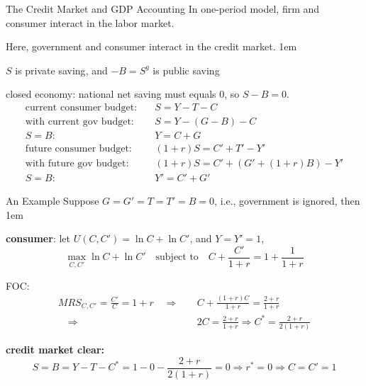 \documentclass[11pt,aspectratio=43,usenames,dvipsnames]{beamer}
\newcommand{\orange}[1]{\textcolor{BurntOrange}{#1}}
\let\olditemize=\itemize
\let\endolditemize=\enditemize
\renewenvironment{itemize}{\olditemize \itemsep1em}{\endolditemize}
\theoremstyle{definition}
\begin{document}
\begin{frame}{The Credit Market and GDP Accounting}
\label{slide:The_Credit_Market_and_GDP_Accounting}
    In \alert{one-period} model, firm and consumer interact in the \alert{labor market}.

    \orange{Here}, government and consumer interact in the \orange{credit market}.
    \begin{itemize}
        \item $ S $ is \alert{private saving}, and $ -B = S^{g} $ is \alert{public saving}
        \item closed economy: national net saving must equals $ 0 $, so $ S - B = 0 $.
        \begin{align*}
            \text{current consumer budget:} \quad
                & S = Y - T - C
            \\
            \text{with current gov budget:} \quad
                & S = Y - ( G-B ) - C
            \\
            S = B: \quad
                & Y = C + G
            \\
            \text{future consumer budget:} \quad
                & ( 1+r ) S = C' + T' - Y'
            \\
            \text{with future gov budget:} \quad
                & ( 1+r ) S = C' + ( G' + ( 1+r ) B ) - Y'
            \\
            S = B: \quad
                & Y' = C' + G'
        \end{align*}
    \end{itemize}
\end{frame}

\begin{frame}{An Example}
\label{slide:An_Example}
    Suppose $ G = G' = T = T' = B = 0 $, i.e., government is ignored, then
    \begin{itemize}
        \item \textbf{consumer}: let $ U( C, C' ) = \ln C + \ln C' $, and $ Y = Y' = 1 $,
        \begin{equation*}
            \max_{C, C'} \ln C + \ln C' \quad \text{subject to} \quad C + \frac{C'}{1+r} = 1 + \frac{1}{1+r}
        \end{equation*}
        \item FOC:
        \begin{align*}
            MRS_{C, C'} = \frac{C'}{C} = 1+r \quad \Rightarrow \quad
                & C + \frac{(1+r)C}{1+r} = \frac{2+r}{1+r}
            \\
            \quad \Rightarrow \quad
                & 2C = \frac{2+r}{1+r} \Rightarrow C^{*} = \frac{2+r}{2( 1+r )}
        \end{align*}
        \item \textbf{credit market clear:}
        \begin{equation*}
            S = B = Y - T - C^{*} = 1 - 0 - \frac{2+r}{2( 1+r )} = 0 \Rightarrow r^{*} = 0 \Rightarrow C = C' = 1
        \end{equation*}
    \end{itemize}
\end{frame}
\end{document}
